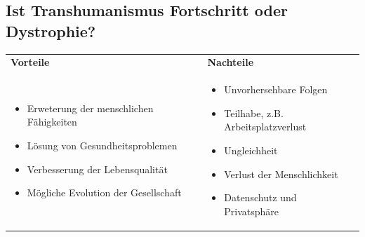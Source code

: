 \documentclass[aspectratio=169,16pt,xcolor=table]{beamer}
\begin{document}

\subsection{Ist Transhumanismus Fortschritt oder Dystrophie?}
  \begin{frame} %
    \begin{center}
    


\begin{tabular}{|p{6.5cm}|@{}p{1cm}@{}|p{6.5cm}|}
    \hline
    \cellcolor{green!40}\textbf{Vorteile} & \textbf{} & \cellcolor{red!50}\textbf{Nachteile} \\
            \small
            \begin{itemize}
                \item Erweterung der menschlichen Fähigkeiten
                \item Lösung von Gesundheitsproblemen
                \item Verbesserung der Lebensqualität
                \item Mögliche Evolution der Gesellschaft
            \end{itemize}
            & & 
            \begin{itemize}
                \item Unvorhersehbare Folgen
                \item Teilhabe, z.B. Arbeitsplatzverlust
                \item Ungleichheit
                \item Verlust der Menschlichkeit
                \item Datenschutz und Privatsphäre
            \end{itemize} \\
        \hline
    \end{tabular}

    \end{center}
\end{frame}

\printbibliography %
\end{document}
